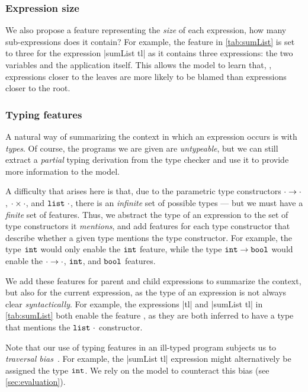 \subsubsection{Expression size}
We also propose a feature representing the \emph{size} of each expression,
\ie how many sub-expressions does it contain?
%
For example, the \ExprSize feature in \autoref{tab:sumList} is set to three
for the expression |sumList tl| as it contains three expressions:
the two variables and the application itself.
%
This allows the model to learn that, \eg, expressions closer to the
leaves are more likely to be blamed than expressions closer to the root.

\subsubsection{Typing features}
A natural way of summarizing the context in which an expression occurs
is with \emph{types}.
%
Of course, the programs we are given are \emph{untypeable}, but we can
still extract a \emph{partial} typing derivation from the type checker
and use it to provide more information to the model.

A difficulty that arises here is that, due to the parametric type
constructors $\cdot \to \cdot$, $\cdot \times \cdot$, and
$\mathtt{list}\ \cdot$, there is an \emph{infinite} set of possible types ---
but we must have a \emph{finite} set of features.
%
Thus, we abstract the type of an expression to the set of type
constructors it \emph{mentions}, and add features for each type
constructor that describe whether a given type mentions the type
constructor.
%
For example, the type $\mathtt{int}$ would only enable the $\mathtt{int}$ feature,
while the type $\mathtt{int} \to \mathtt{bool}$ would enable the
$\cdot \to \cdot$, $\mathtt{int}$, and $\mathtt{bool}$ features.

We add these features for parent and child expressions to summarize the
context, but also for the current expression, as the type of an
expression is not always clear \emph{syntactically}.
%
For example, the expressions |tl| and |sumList tl|
in \autoref{tab:sumList} both enable the feature \HasTypeList, as they
are both inferred to have a type that mentions the $\mathtt{list}\ \cdot$
constructor.

Note that our use of typing features in an ill-typed program
subjects us to \emph{traversal
bias}~\cite{McAdam1998-ub,Yang2000-yr}. For example, the 
|sumList tl| expression might alternatively be assigned
the type $\mathtt{int}$.
%
We rely on the model to counteract this bias (see \autoref{sec:evaluation}).

